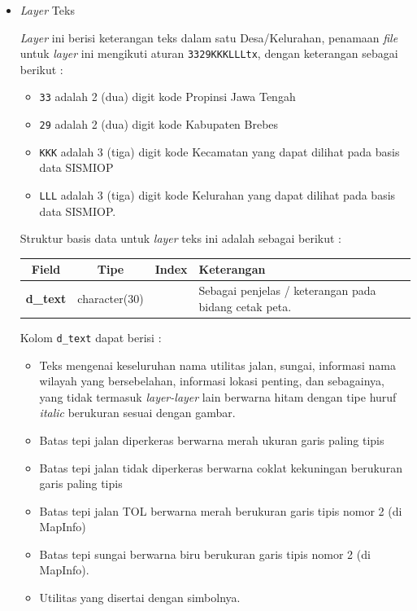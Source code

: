 \begin{itemize}
  \item \textit{Layer} Teks
  
  \textit{Layer} ini berisi keterangan teks dalam satu Desa/Kelurahan, penamaan \textit{file} untuk \textit{layer} ini mengikuti aturan \texttt{3329KKKLLLtx}, dengan keterangan sebagai berikut :
  
  \begin{itemize}
    \item \texttt{33} adalah 2 (dua) digit kode Propinsi Jawa Tengah
    \item \texttt{29} adalah 2 (dua) digit kode Kabupaten Brebes
    \item \texttt{KKK} adalah 3 (tiga) digit kode Kecamatan yang dapat dilihat pada basis data SISMIOP
    \item \texttt{LLL} adalah 3 (tiga) digit kode Kelurahan yang dapat dilihat pada basis data SISMIOP.
  \end{itemize}
  
  Struktur basis data untuk \textit{layer} teks ini adalah sebagai berikut :
  
  \begin{table}[H]
    \centering
    \begin{tabular}{| c | c | c | p{7cm} |}
      \hline
      Field & Tipe & Index & Keterangan \\
      \hline\hline
      \textbf{d\_text} & character(30) & & Sebagai penjelas / keterangan pada bidang cetak peta. \\
      \hline
    \end{tabular}
  \end{table}
  
  Kolom \texttt{d\_text} dapat berisi :
  
  \begin{itemize}
    \item Teks mengenai keseluruhan nama utilitas jalan, sungai, informasi nama wilayah yang bersebelahan, informasi lokasi penting, dan sebagainya, yang tidak termasuk \textit{layer-layer} lain berwarna hitam dengan tipe huruf \textit{italic} berukuran sesuai dengan gambar.
    \item Batas tepi jalan diperkeras berwarna merah ukuran garis paling tipis
    \item Batas tepi jalan tidak diperkeras berwarna coklat kekuningan berukuran garis paling tipis
    \item Batas tepi jalan TOL berwarna merah berukuran garis tipis nomor 2 (di MapInfo)
    \item Batas tepi sungai berwarna biru berukuran garis tipis nomor 2 (di MapInfo).
    \item Utilitas yang disertai dengan simbolnya.
  \end{itemize}
  

\end{itemize}
